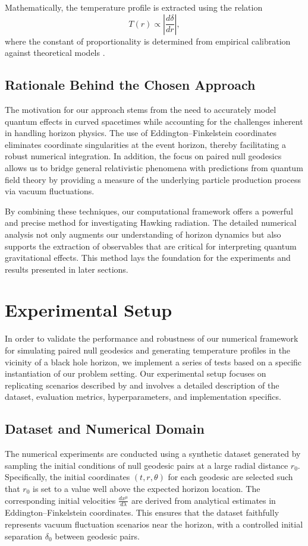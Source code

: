 \documentclass{article}\usepackage[utf8]{inputenc} %
\begin{document}
Mathematically, the temperature profile is extracted using the relation
\begin{equation}
T(r) \propto \left| \frac{d\delta}{dr}\right|, 
\end{equation}
where the constant of proportionality is determined from empirical calibration against theoretical models \cite{Unruh1976}. 

\subsection{Rationale Behind the Chosen Approach}
The motivation for our approach stems from the need to accurately model quantum effects in curved spacetimes while accounting for the challenges inherent in handling horizon physics. The use of Eddington–Finkelstein coordinates eliminates coordinate singularities at the event horizon, thereby facilitating a robust numerical integration. In addition, the focus on paired null geodesics allows us to bridge general relativistic phenomena with predictions from quantum field theory by providing a measure of the underlying particle production process via vacuum fluctuations.

By combining these techniques, our computational framework offers a powerful and precise method for investigating Hawking radiation. The detailed numerical analysis not only augments our understanding of horizon dynamics but also supports the extraction of observables that are critical for interpreting quantum gravitational effects. This method lays the foundation for the experiments and results presented in later sections.

\section{Experimental Setup}
In order to validate the performance and robustness of our numerical framework for simulating paired null geodesics and generating temperature profiles in the vicinity of a black hole horizon, we implement a series of tests based on a specific instantiation of our problem setting. Our experimental setup focuses on replicating scenarios described by \cite{Hawking1975,Jacobson1993,Unruh1976} and involves a detailed description of the dataset, evaluation metrics, hyperparameters, and implementation specifics.

\subsection{Dataset and Numerical Domain}
The numerical experiments are conducted using a synthetic dataset generated by sampling the initial conditions of null geodesic pairs at a large radial distance $r_{0}$. Specifically, the initial coordinates $(t, r, \theta)$ for each geodesic are selected such that $r_{0}$ is set to a value well above the expected horizon location. The corresponding initial velocities $\frac{dx^{\mu}}{d\lambda}$ are derived from analytical estimates in Eddington--Finkelstein coordinates. This ensures that the dataset faithfully represents vacuum fluctuation scenarios near the horizon, with a controlled initial separation $\delta_{0}$ between geodesic pairs.
\end{document}

